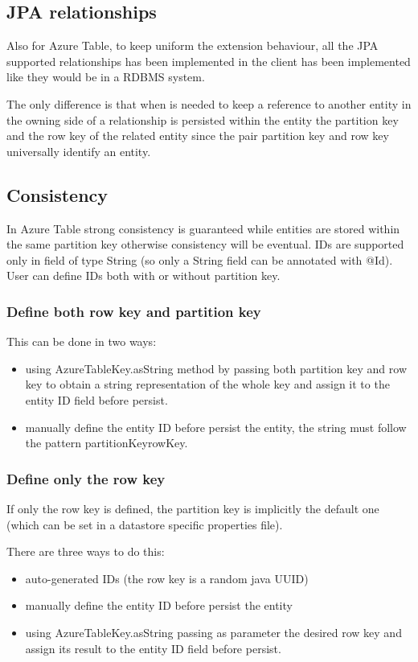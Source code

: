 \subsection{JPA relationships}
Also for Azure Table, to keep uniform the extension behaviour, all the JPA supported relationships has been implemented in the client has been implemented like they would be in a RDBMS system.

The only difference is that when is needed to keep a reference to another entity in the owning side of a relationship is persisted within the entity the partition key and the row key of the related entity since the pair partition key and row key universally identify an entity.

\subsection{Consistency}
In Azure Table strong consistency is guaranteed while entities are stored within the same partition key otherwise consistency will be eventual. IDs are supported only in field of type String (so only a String field can be annotated with @Id). User can define IDs both with or without partition key.

\subsubsection{Define both row key and partition key}
This can be done in two ways:
\begin{itemize}
\item using AzureTableKey.asString method by passing both partition key and row key to obtain a string representation of the whole key and assign it to the entity ID field before persist.
\item manually define the entity ID before persist the entity, the string must follow the pattern partitionKey\textunderscore rowKey.
\end{itemize}

\subsubsection{Define only the row key}
If only the row key is defined, the partition key is implicitly the default one (which can be set in a datastore specific properties file).

There are three ways to do this:
\begin{itemize}
\item auto-generated IDs (the row key is a random java UUID)
\item manually define the entity ID before persist the entity
\item using AzureTableKey.asString passing as parameter the desired row key and assign its result to the entity ID field before persist.
\end{itemize}

